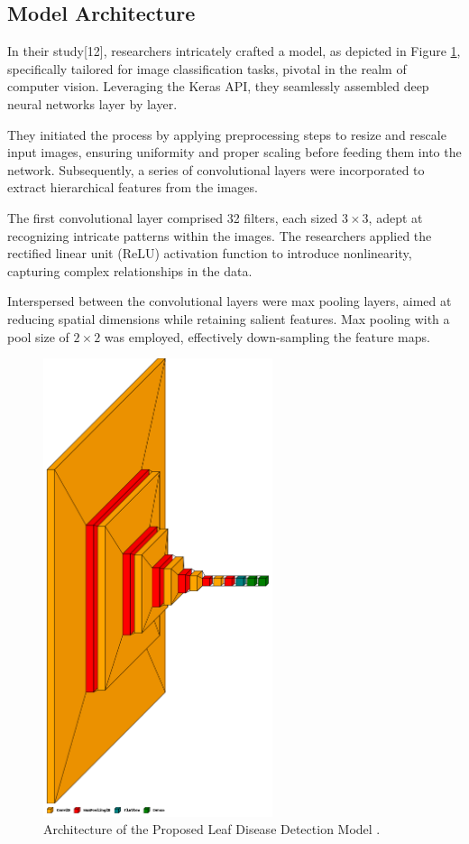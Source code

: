 \documentclass{article}
\begin{document}
\subsection{Model Architecture}

In their study[12], researchers intricately crafted a  model, as depicted in Figure \ref{fig:lddta}, specifically tailored for image classification tasks, pivotal in the realm of computer vision. Leveraging the Keras API, they seamlessly assembled deep neural networks layer by layer.

They initiated the process by applying preprocessing steps to resize and rescale input images, ensuring uniformity and proper scaling before feeding them into the network. Subsequently, a series of convolutional layers were incorporated to extract hierarchical features from the images.

The first convolutional layer comprised 32 filters, each sized $3 \times 3$, adept at recognizing intricate patterns within the images. The researchers applied the rectified linear unit (ReLU) activation function to introduce nonlinearity, capturing complex relationships in the data.

Interspersed between the convolutional layers were max pooling layers, aimed at reducing spatial dimensions while retaining salient features. Max pooling with a pool size of $2 \times 2$ was employed, effectively down-sampling the feature maps.

\begin{figure}[h]
    \centering
    \includegraphics[width=0.60\textwidth, height=0.4\textheight]{lddta_architecture}
    \caption{Architecture of the Proposed Leaf Disease Detection Model .}
    \label{fig:lddta}
\end{figure}
\end{document}
